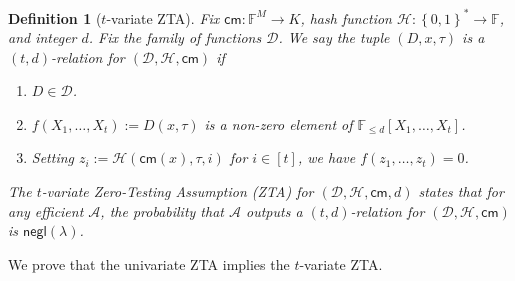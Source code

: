 \documentclass[11pt]{article} %
\newcommand{\F}{\ensuremath{\mathbb F}\xspace}
\newcommand{\adv}{\ensuremath{\mathcal A}\xspace}
\newcommand{\cm}{\ensuremath{\mathsf{cm}}\xspace}
\newcommand{\negl}{\ensuremath{\mathsf{negl}(\lambda)}\xspace}
\newcommand{\defeq}{:=}
\newcommand{\B}{\ensuremath{\set{0,1}}\xspace}
\newcommand{\hash}{\ensuremath{\mathcal{H}}\xspace}
\newcommand{\set}[1]{\ensuremath{\left\{#1\right\}}\xspace}
\newtheorem{dfn}[lemma]{Definition}
\newcommand{\ztafuncs}{\ensuremath{\mathcal{D}}\xspace}
\begin{document}
\begin{dfn}[$t$-variate ZTA]\label{dfn:multiZTA}
Fix $\cm:\F^M\to K$, hash function $\hash:\B^*\to \F$, and integer $d$. Fix the family of functions \ztafuncs.
We say the tuple $(D,x,\tau)$ is a \emph{$(t,d)$-relation for $(\ztafuncs,\hash,\cm)$} if
\begin{enumerate}
 \item $D\in \ztafuncs$.
 \item $f(X_1,\ldots,X_t)\defeq D(x,\tau)$ is a non-zero element of $\F_{\leq d}[X_1,\ldots,X_t]$.
 \item Setting $z_i\defeq \hash(\cm(x),\tau,i)$ for $i\in[t]$, we have $f(z_1,\ldots,z_t)=0$.
\end{enumerate}
The $t$-variate Zero-Testing Assumption (ZTA) for $(\ztafuncs,\hash,\cm,d)$ states that for any efficient \adv, the probability that
\adv outputs a $(t,d)$-relation for $(\ztafuncs,\hash,\cm)$ is \negl.
\end{dfn}

We prove that the univariate ZTA implies the $t$-variate ZTA.
\end{document}
